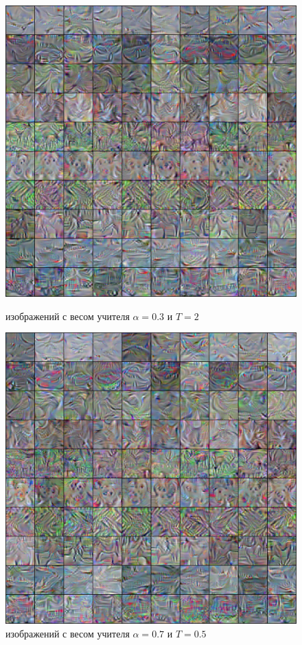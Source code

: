 \documentclass[12pt]{article}
\begin{document}
\begin{figure}[ht] \label{fig7} 
  \begin{minipage}[b]{0.5\linewidth}
    \includegraphics[width=1\textwidth]{dist_2_03.png}
    \caption{ изображений с весом \;\;\;учителя $\alpha = 0.3$ и $T = 2$} 
  \end{minipage} 
  \begin{minipage}[b]{0.5\linewidth}
    \includegraphics[width=1\textwidth]{dist_05_07.png}
    \caption{ изображений с весом \;\;\;учителя $\alpha = 0.7$ и $T = 0.5$} 
  \end{minipage} 
\end{figure}
    
\end{document}
